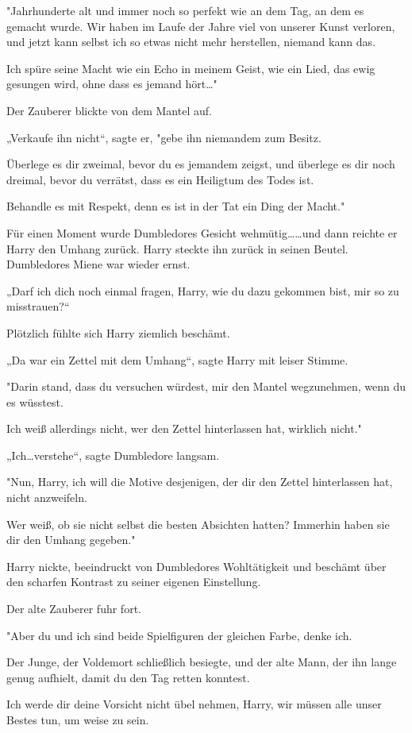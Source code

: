 {"Jahrhunderte alt und immer noch so perfekt wie an dem Tag, an dem es gemacht wurde. Wir haben im Laufe der Jahre viel von unserer Kunst verloren, und jetzt kann selbst ich so etwas nicht mehr herstellen, niemand kann das.

Ich spüre seine Macht wie ein Echo in meinem Geist, wie ein Lied, das ewig gesungen wird, ohne dass es jemand hört…"

Der Zauberer blickte von dem Mantel auf.

„Verkaufe ihn nicht“, sagte er, "gebe ihn niemandem zum Besitz.

Überlege es dir zweimal, bevor du es jemandem zeigst, und überlege es dir noch dreimal, bevor du verrätst, dass es ein Heiligtum des Todes ist.

Behandle es mit Respekt, denn es ist in der Tat ein Ding der Macht."

Für einen Moment wurde Dumbledores Gesicht wehmütig……und dann reichte er Harry den Umhang zurück. Harry steckte ihn zurück in seinen Beutel. Dumbledores Miene war wieder ernst.

„Darf ich dich noch einmal fragen, Harry, wie du dazu gekommen bist, mir so zu misstrauen?“

Plötzlich fühlte sich Harry ziemlich beschämt.

„Da war ein Zettel mit dem Umhang“, sagte Harry mit leiser Stimme.

"Darin stand, dass du versuchen würdest, mir den Mantel wegzunehmen, wenn du es wüsstest.

Ich weiß allerdings nicht, wer den Zettel hinterlassen hat, wirklich nicht."

„Ich…verstehe“, sagte Dumbledore langsam.

"Nun, Harry, ich will die Motive desjenigen, der dir den Zettel hinterlassen hat, nicht anzweifeln.

Wer weiß, ob sie nicht selbst die besten Absichten hatten? Immerhin haben sie dir den Umhang gegeben."

Harry nickte, beeindruckt von Dumbledores Wohltätigkeit und beschämt über den scharfen Kontrast zu seiner eigenen Einstellung.

Der alte Zauberer fuhr fort.

"Aber du und ich sind beide Spielfiguren der gleichen Farbe, denke ich.

Der Junge, der Voldemort schließlich besiegte, und der alte Mann, der ihn lange genug aufhielt, damit du den Tag retten konntest.

Ich werde dir deine Vorsicht nicht übel nehmen, Harry, wir müssen alle unser Bestes tun, um weise zu sein.

}
